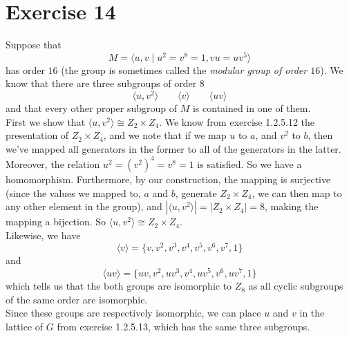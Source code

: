 \documentclass[12pt]{article}
\begin{document}
    \section*{Exercise 14}
    Suppose that
    \[ M = \langle u, v \mid u^2 = v^8 = 1, vu = uv^5 \rangle \] 
    has order $16$
    (the group is sometimes called the \textit{modular group of order $16$}).
    We know that there are three subgroups of order $8$
    \[ \langle u, v^2 \rangle
    \qquad \langle v \rangle 
    \qquad \langle uv \rangle \]
    and that every other proper subgroup of $M$ is contained
    in one of them. \\
    First we show that $\langle u, v^2 \rangle \cong Z_2 \times Z_4$.
    We know from exercise 1.2.5.12
    the presentation of $Z_2 \times Z_4$,
    and we note that if we map $u$ to $a$, and $v^2$ to $b$,
    then we've mapped all generators in the former
    to all of the generators in the latter.
    Moreover, the relation $u^2 = (v^2)^4 = v^8 = 1$ is satisfied.
    So we have a homomorphism.
    Furthermore, by our construction,
    the mapping is surjective
    (since the values we mapped to, $a$ and $b$, generate $Z_2 \times Z_4$,
    we can then map to any other element in the group),
    and $|\langle u, v^2 \rangle| = |Z_2 \times Z_4| = 8$,
    making the mapping a bijection.
    So $\langle u, v^2 \rangle \cong Z_2 \times Z_4$. \\
    Likewise, we have 
    \[\langle v \rangle = \{v, v^2, v^3, v^4, v^5, v^6, v^7, 1\} \]
    and
    \[\langle uv \rangle = \{uv, v^2, uv^3, v^4, uv^5, v^6, uv^7, 1\} \]
    which tells us that the both groups are isomorphic to $Z_8$ 
    as all cyclic subgroups of the same order are isomorphic. \\ 
    Since these groups are respectively isomorphic,
    we can place $u$ and $v$ in the lattice of $G$
    from exercise 1.2.5.13, which has the same three subgroups.
\end{document}
